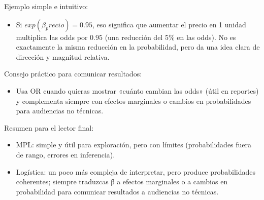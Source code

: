 \documentclass[
  spanish,
  letterpaper,
  DIV=11,
  numbers=noendperiod]{scrreprt}
\providecommand{\tightlist}{%
  \setlength{\itemsep}{0pt}\setlength{\parskip}{0pt}}
\begin{document}
Ejemplo simple e intuitivo:

\begin{itemize}
\tightlist
\item
  Si \(exp(β_precio) = 0.95\), eso significa que aumentar el precio en 1
  unidad multiplica las odds por \(0.95\) (una reducción del 5\% en las
  odds). No es exactamente la misma reducción en la probabilidad, pero
  da una idea clara de dirección y magnitud relativa.
\end{itemize}

Consejo práctico para comunicar resultados:

\begin{itemize}
\tightlist
\item
  Usa OR cuando quieras mostrar «cuánto cambian las odds» (útil en
  reportes) y complementa siempre con efectos marginales o cambios en
  probabilidades para audiencias no técnicas.
\end{itemize}

Resumen para el lector final:

\begin{itemize}
\tightlist
\item
  MPL: simple y útil para exploración, pero con límites (probabilidades
  fuera de rango, errores en inferencia).
\item
  Logística: un poco más compleja de interpretar, pero produce
  probabilidades coherentes; siempre traduzcas β a efectos marginales o
  a cambios en probabilidad para comunicar resultados a audiencias no
  técnicas.
\end{itemize}
\end{document}
